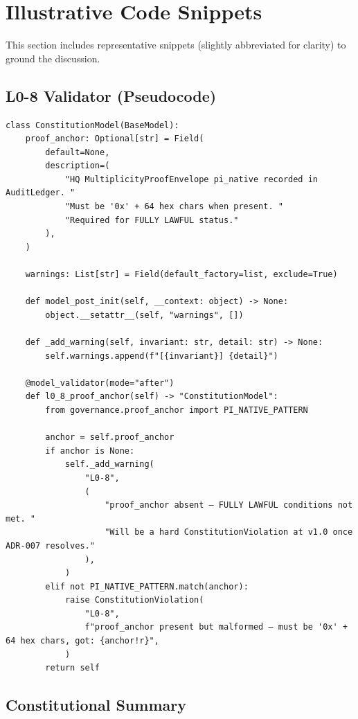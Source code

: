 \documentclass[11pt]{article}
\begin{document}

\section{Illustrative Code Snippets}

This section includes representative snippets (slightly abbreviated for clarity) to ground the discussion.

\subsection{L0-8 Validator (Pseudocode)}

\begin{verbatim}
class ConstitutionModel(BaseModel):
    proof_anchor: Optional[str] = Field(
        default=None,
        description=(
            "HQ MultiplicityProofEnvelope pi_native recorded in AuditLedger. "
            "Must be '0x' + 64 hex chars when present. "
            "Required for FULLY LAWFUL status."
        ),
    )

    warnings: List[str] = Field(default_factory=list, exclude=True)

    def model_post_init(self, __context: object) -> None:
        object.__setattr__(self, "warnings", [])

    def _add_warning(self, invariant: str, detail: str) -> None:
        self.warnings.append(f"[{invariant}] {detail}")

    @model_validator(mode="after")
    def l0_8_proof_anchor(self) -> "ConstitutionModel":
        from governance.proof_anchor import PI_NATIVE_PATTERN

        anchor = self.proof_anchor
        if anchor is None:
            self._add_warning(
                "L0-8",
                (
                    "proof_anchor absent — FULLY LAWFUL conditions not met. "
                    "Will be a hard ConstitutionViolation at v1.0 once ADR-007 resolves."
                ),
            )
        elif not PI_NATIVE_PATTERN.match(anchor):
            raise ConstitutionViolation(
                "L0-8",
                f"proof_anchor present but malformed — must be '0x' + 64 hex chars, got: {anchor!r}",
            )
        return self
\end{verbatim}

\subsection{Constitutional Summary}
\end{document}
